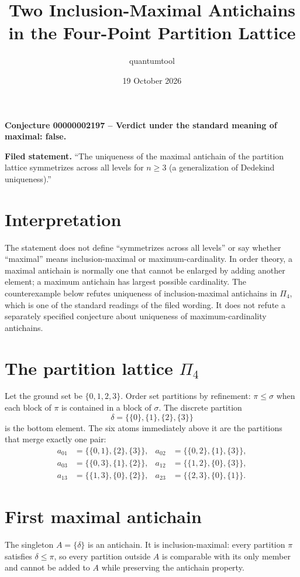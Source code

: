 \documentclass[11pt]{article}
\title{Two Inclusion-Maximal Antichains in the Four-Point Partition Lattice}
\author{quantumtool}
\date{19 October 2026}
\begin{document}
\maketitle

\textbf{Conjecture 00000002197 -- Verdict under the standard meaning of maximal: false.}

\textbf{Filed statement.} “The uniqueness of the maximal antichain of the partition lattice symmetrizes across all levels for $n\ge 3$ (a generalization of Dedekind uniqueness).”

\section*{Interpretation}
The statement does not define “symmetrizes across all levels” or say whether “maximal” means inclusion-maximal or maximum-cardinality. In order theory, a maximal antichain is normally one that cannot be enlarged by adding another element; a maximum antichain has largest possible cardinality. The counterexample below refutes uniqueness of inclusion-maximal antichains in $\Pi_4$, which is one of the standard readings of the filed wording. It does not refute a separately specified conjecture about uniqueness of maximum-cardinality antichains.

\section*{The partition lattice $\Pi_4$}
Let the ground set be $\{0,1,2,3\}$. Order set partitions by refinement: $\pi\leq\sigma$ when each block of $\pi$ is contained in a block of $\sigma$. The discrete partition
\[
\delta=\{\{0\},\{1\},\{2\},\{3\}\}
\]
is the bottom element. The six atoms immediately above it are the partitions that merge exactly one pair:
\[
\begin{aligned}
a_{01}&=\{\{0,1\},\{2\},\{3\}\}, & a_{02}&=\{\{0,2\},\{1\},\{3\}\},\\
a_{03}&=\{\{0,3\},\{1\},\{2\}\}, & a_{12}&=\{\{1,2\},\{0\},\{3\}\},\\
a_{13}&=\{\{1,3\},\{0\},\{2\}\}, & a_{23}&=\{\{2,3\},\{0\},\{1\}\}.
\end{aligned}
\]

\section*{First maximal antichain}
The singleton $A=\{\delta\}$ is an antichain. It is inclusion-maximal: every partition $\pi$ satisfies $\delta\leq\pi$, so every partition outside $A$ is comparable with its only member and cannot be added to $A$ while preserving the antichain property.
\end{document}

